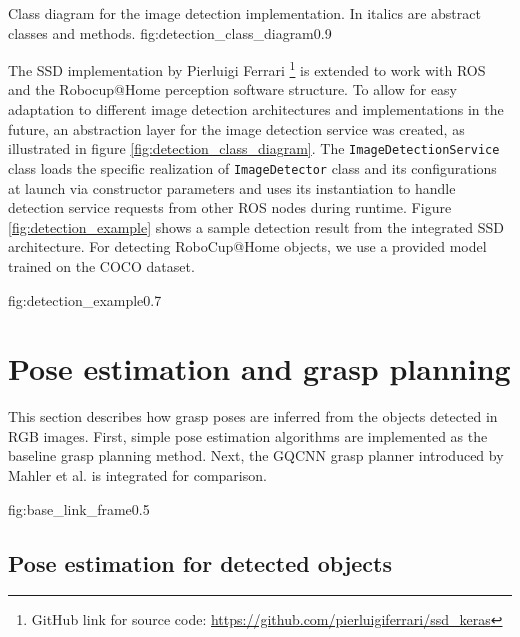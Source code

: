              {Class diagram for the image detection implementation. In italics are abstract classes and methods.}
             {fig:detection_class_diagram}{0.9\textwidth}

The SSD implementation by Pierluigi Ferrari \footnote{GitHub link for source code:
    \url{https://github.com/pierluigiferrari/ssd_keras}} is extended to work with ROS and the Robocup@Home perception
software structure. To allow for easy adaptation to different image detection architectures and implementations in the
future, an abstraction layer for the image detection service was created, as illustrated in figure
\ref{fig:detection_class_diagram}. The \texttt{ImageDetectionService} class loads the specific realization of
\texttt{ImageDetector} class and its configurations at launch via constructor parameters and uses its instantiation to
handle detection service requests from other ROS nodes during runtime. Figure \ref{fig:detection_example} shows a
sample detection result from the integrated SSD architecture. For detecting RoboCup@Home objects, we use a provided
model trained on the COCO dataset.

             {fig:detection_example}{0.7\textwidth}


\section{Pose estimation and grasp planning}

This section describes how grasp poses are inferred from the objects detected in RGB images. First, simple pose
estimation algorithms are implemented as the baseline grasp planning method. Next, the GQCNN grasp planner introduced
by Mahler et al. \cite{mahler2017} is integrated for comparison.

             {fig:base_link_frame}{0.5\textwidth}

\subsection{Pose estimation for detected objects} \label{sub:pose_estimation}

